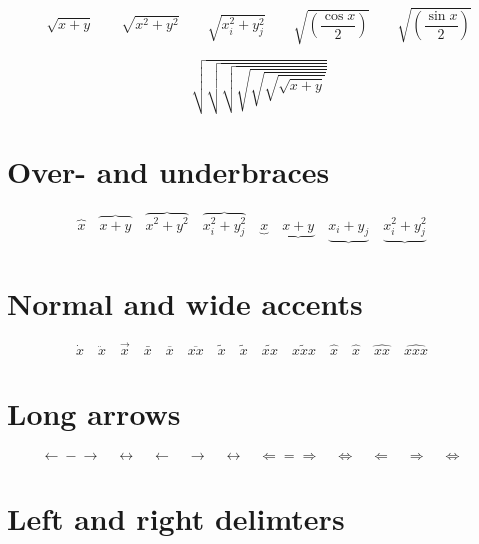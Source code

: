 \documentclass[fleqn]{article}
\begin{document}
\begin{displaymath}
  \sqrt{x+y} \qquad \sqrt{x^{2}+y^{2}} \qquad 
  \sqrt{x_{i}^{2}+y_{j}^{2}} \qquad
  \sqrt{\left(\frac{\cos x}{2}\right)} \qquad 
  \sqrt{\left(\frac{\sin x}{2}\right)}
\end{displaymath}
  
\begingroup
\delimitershortfall-1pt
\begin{displaymath}
  \sqrt{\sqrt{\sqrt{\sqrt{\sqrt{\sqrt{\sqrt{x+y}}}}}}}
\end{displaymath}
\endgroup %


\section{Over- and underbraces}

\begin{displaymath}
  \overbrace{x} \quad
  \overbrace{x+y} \quad
  \overbrace{x^{2}+y^{2}} \quad
  \overbrace{x_{i}^{2}+y_{j}^{2}} \quad
  \underbrace{x} \quad
  \underbrace{x+y} \quad
  \underbrace{x_{i}+y_{j}} \quad
  \underbrace{x_{i}^{2}+y_{j}^{2}} \quad
\end{displaymath}


\section{Normal and wide accents}

\begin{displaymath}
  \dot{x} \quad 
  \ddot{x} \quad 
  \vec{x} \quad 
  \bar{x} \quad
  \overline{x} \quad
  \overline{xx} \quad
  \tilde{x} \quad
  \widetilde{x} \quad
  \widetilde{xx} \quad
  \widetilde{xxx} \quad
  \hat{x} \quad 
  \widehat{x} \quad 
  \widehat{xx} \quad 
  \widehat{xxx} \quad
\end{displaymath}


\section{Long arrows}

\begin{displaymath}
  \leftarrow \mathrel{-} \rightarrow \quad
  \leftrightarrow \quad
  \longleftarrow  \quad
  \longrightarrow \quad
  \longleftrightarrow \quad
  \Leftarrow = \Rightarrow \quad
  \Leftrightarrow \quad
  \Longleftarrow  \quad
  \Longrightarrow \quad
  \Longleftrightarrow \quad
\end{displaymath}


\section{Left and right delimters}
\end{document}
